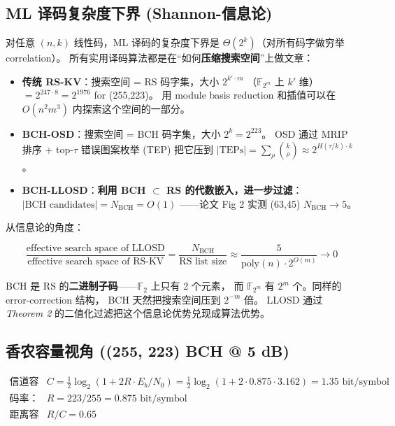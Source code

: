 \documentclass[11pt,a4paper]{article}
\begin{document}
\subsection{ML 译码复杂度下界 (Shannon-信息论)}

对任意 $(n,k)$ 线性码，ML 译码的复杂度下界是 $\Theta(2^k)$（对所有码字做穷举 correlation）。
所有实用译码算法都是在``如何\textbf{压缩搜索空间}''上做文章：

\begin{itemize}
\item \textbf{传统 RS-KV}：搜索空间 = RS 码字集，大小 $2^{k'\cdot m}$
（$\mathbb{F}_{2^m}$ 上 $k'$ 维）$= 2^{247\cdot 8} = 2^{1976}$ for (255,223)。
用 module basis reduction 和插值可以在 $O(n^2 m^3)$ 内探索这个空间的一部分。

\item \textbf{BCH-OSD}：搜索空间 = BCH 码字集，大小 $2^k = 2^{223}$。
OSD 通过 MRIP 排序 + top-$\tau$ 错误图案枚举 (TEP) 把它压到
$|\text{TEPs}| = \sum_\rho \binom{k}{\rho} \approx 2^{H(\tau/k)\cdot k}$。

\item \textbf{BCH-LLOSD}：\textbf{利用 BCH $\subset$ RS 的代数嵌入，进一步过滤}：
$|\text{BCH candidates}| = N_{\text{BCH}} = O(1)$
——论文 Fig 2 实测 (63,45) $N_{\text{BCH}} \to 5$。
\end{itemize}

从信息论的角度：

\begin{equation}
\frac{\text{effective search space of LLOSD}}{\text{effective search space of RS-KV}}
= \frac{N_{\text{BCH}}}{\text{RS list size}}
\approx \frac{5}{\text{poly}(n)\cdot 2^{O(m)}} \to 0
\end{equation}

\begin{keybox}[title=\textbf{本质原因}]
BCH 是 RS 的\textbf{二进制子码}——$\mathbb{F}_2$ 上只有 2 个元素，
而 $\mathbb{F}_{2^m}$ 有 $2^m$ 个。同样的 error-correction 结构，
BCH 天然把搜索空间压到 $2^{-m}$ 倍。
LLOSD 通过 \emph{Theorem 2} 的二值化过滤把这个信息论优势兑现成算法优势。
\end{keybox}

\subsection{香农容量视角 ((255, 223) BCH @ 5 dB)}

\begin{align*}
\text{信道容量：}\quad & C = \tfrac{1}{2}\log_2(1 + 2R\cdot E_b/N_0)
= \tfrac{1}{2}\log_2(1 + 2\cdot 0.875\cdot 3.162) = \bm{1.35}\text{ bit/symbol} \\
\text{码率：}\quad & R = 223/255 = \bm{0.875}\text{ bit/symbol} \\
\text{距离容量：}\quad & R/C = 0.65
\end{align*}
\end{document}
